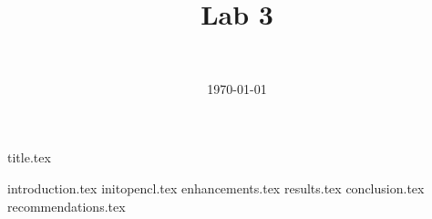 \documentclass[final]{report} %
\title{Lab 3}
\author{~}
\date{\today}
\begin{document}

{title.tex}
\newpage
\tableofcontents

\newpage
{}
{introduction.tex}
{initopencl.tex}
{enhancements.tex}
{results.tex}
{conclusion.tex}
{recommendations.tex}
\newpage
{}

\printbibliography
\end{document}
